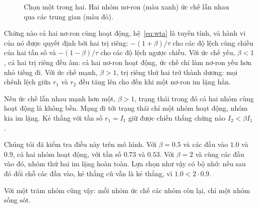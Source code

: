 \begin{figure}[t]
\centering
{}
\caption{Chọn một trong hai. Hai nhóm nơ-ron  (màu xanh) ức chế lẫn nhau qua các trung gian  (màu đỏ).}
\label{fig:wta}
\end{figure}

Chừng nào cả hai nơ-ron cùng hoạt động, hệ~\eqref{eq:wta} là tuyến tính, và hành vi của nó được quyết định bởi hai trị riêng: $-(1+\beta)/\tau$ cho các độ lệch cùng chiều của hai tần số và $-(1-\beta)/\tau$ cho các độ lệch ngược chiều. Với ức chế yếu, $\beta<1$, cả hai trị riêng đều âm: cả hai nơ-ron hoạt động, ức chế chỉ làm nơ-ron yếu hơn nhỏ tiếng đi. Với ức chế mạnh, $\beta>1$, trị riêng thứ hai trở thành dương: mọi chênh lệch giữa $r_1$ và $r_2$ đều tăng lên cho đến khi một nơ-ron im lặng hẳn.

\begin{keyblock}
\begin{proposition}
\label{prop:wta}
Nếu ức chế lẫn nhau mạnh hơn một, $\beta>1$, trạng thái trong đó cả hai nhóm cùng hoạt động là không bền. Mạng đi tới trạng thái chỉ một nhóm hoạt động, nhóm kia im lặng. Kẻ thắng với tần số $r_1=I_1$ giữ được chiến thắng chừng nào $I_2<\beta I_1$.
\end{proposition}
\end{keyblock}

Chúng tôi đã kiểm tra điều này trên mô hình. Với $\beta=0.5$ và các đầu vào $1.0$ và $0.9$, cả hai nhóm hoạt động, với tần số $0.73$ và $0.53$. Với $\beta=2$ và cùng các đầu vào đó, nhóm thứ hai im lặng hoàn toàn. Lựa chọn như vậy có bộ nhớ: nếu sau đó đổi chỗ các đầu vào, kẻ thắng cũ vẫn là kẻ thắng, vì $1.0<2\cdot0.9$.

Với một trăm nhóm cũng vậy: mỗi nhóm ức chế các nhóm còn lại, chỉ một nhóm sống sót.

